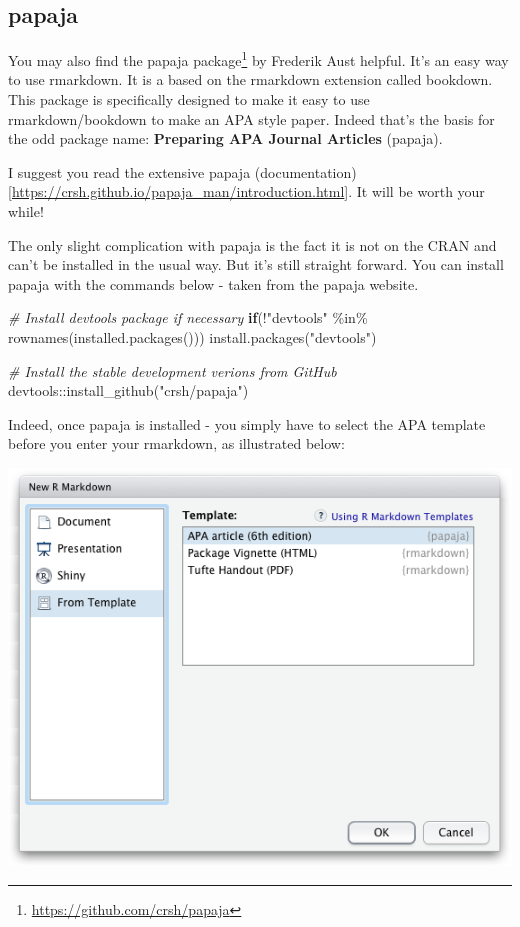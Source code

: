 \documentclass[
]{krantz}
\makeatletter
\newenvironment{Shaded}{\begin{snugshade}}{\end{snugshade}}
\newcommand{\CommentTok}[1]{\textcolor[rgb]{0.37,0.37,0.37}{\textit{#1}}}
\newcommand{\ControlFlowTok}[1]{\textcolor[rgb]{0.27,0.27,0.27}{\textbf{#1}}}
\newcommand{\FunctionTok}[1]{\textcolor[rgb]{0,0,0}{#1}}
\newcommand{\NormalTok}[1]{#1}
\newcommand{\SpecialCharTok}[1]{\textcolor[rgb]{0,0,0}{#1}}
\newcommand{\StringTok}[1]{\textcolor[rgb]{0.5,0.5,0.5}{#1}}
\renewcommand{\href}[2]{#2\footnote{\url{#1}}}
\newenvironment{kframe}{%
\medskip{}
\setlength{\fboxsep}{.8em}
 \def\at@end@of@kframe{}%
 \ifinner\ifhmode%
  \def\at@end@of@kframe{\end{minipage}}%
  \begin{minipage}{\columnwidth}%
 \fi\fi%
 \def\FrameCommand##1{\hskip\@totalleftmargin \hskip-\fboxsep
 \colorbox{shadecolor}{##1}\hskip-\fboxsep
     \hskip-\linewidth \hskip-\@totalleftmargin \hskip\columnwidth}%
 \MakeFramed {\advance\hsize-\width
   \@totalleftmargin\z@ \linewidth\hsize
   \@setminipage}}%
 {\par\unskip\endMakeFramed%
 \at@end@of@kframe}
\renewenvironment{Shaded}{\begin{kframe}}{\end{kframe}}
\makeatother
\begin{document}
\hypertarget{papaja}{%
\subsection{papaja}\label{papaja}}

You may also find the \href{https://github.com/crsh/papaja}{papaja package} by Frederik Aust helpful. It's an easy way to use rmarkdown. It is a based on the rmarkdown extension called bookdown. This package is specifically designed to make it easy to use rmarkdown/bookdown to make an APA style paper. Indeed that's the basis for the odd package name: \textbf{Preparing APA Journal Articles} (papaja).

I suggest you read the extensive papaja (documentation){[}\url{https://crsh.github.io/papaja_man/introduction.html}{]}. It will be worth your while!

The only slight complication with papaja is the fact it is not on the CRAN and can't be installed in the usual way. But it's still straight forward. You can install papaja with the commands below - taken from the papaja website.

\begin{Shaded}
\begin{Highlighting}[]
\CommentTok{\# Install devtools package if necessary}
\ControlFlowTok{if}\NormalTok{(}\SpecialCharTok{!}\StringTok{"devtools"} \SpecialCharTok{\%in\%} \FunctionTok{rownames}\NormalTok{(}\FunctionTok{installed.packages}\NormalTok{())) }\FunctionTok{install.packages}\NormalTok{(}\StringTok{"devtools"}\NormalTok{)}

\CommentTok{\# Install the stable development verions from GitHub}
\NormalTok{devtools}\SpecialCharTok{::}\FunctionTok{install\_github}\NormalTok{(}\StringTok{"crsh/papaja"}\NormalTok{)}
\end{Highlighting}
\end{Shaded}

Indeed, once papaja is installed - you simply have to select the APA template before you enter your rmarkdown, as illustrated below:

\includegraphics[width=0.6\linewidth]{ch_tools/images/papaja_template}
\end{document}
